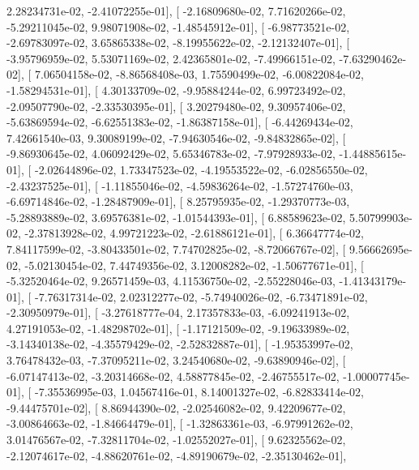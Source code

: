 \documentclass{article}
\begin{document}
          2.28234731e-02,  -2.41072255e-01],
       [ -2.16809680e-02,   7.71620266e-02,  -5.29211045e-02,
          9.98071908e-02,  -1.48545912e-01],
       [ -6.98773521e-02,  -2.69783097e-02,   3.65865338e-02,
         -8.19955622e-02,  -2.12132407e-01],
       [ -3.95796959e-02,   5.53071169e-02,   2.42365801e-02,
         -7.49966151e-02,  -7.63290462e-02],
       [  7.06504158e-02,  -8.86568408e-03,   1.75590499e-02,
         -6.00822084e-02,  -1.58294531e-01],
       [  4.30133709e-02,  -9.95884244e-02,   6.99723492e-02,
         -2.09507790e-02,  -2.33530395e-01],
       [  3.20279480e-02,   9.30957406e-02,  -5.63869594e-02,
         -6.62551383e-02,  -1.86387158e-01],
       [ -6.44269434e-02,   7.42661540e-03,   9.30089199e-02,
         -7.94630546e-02,  -9.84832865e-02],
       [ -9.86930645e-02,   4.06092429e-02,   5.65346783e-02,
         -7.97928933e-02,  -1.44885615e-01],
       [ -2.02644896e-02,   1.73347523e-02,  -4.19553522e-02,
         -6.02856550e-02,  -2.43237525e-01],
       [ -1.11855046e-02,  -4.59836264e-02,  -1.57274760e-03,
         -6.69714846e-02,  -1.28487909e-01],
       [  8.25795935e-02,  -1.29370773e-03,  -5.28893889e-02,
          3.69576381e-02,  -1.01544393e-01],
       [  6.88589623e-02,   5.50799903e-02,  -2.37813928e-02,
          4.99721223e-02,  -2.61886121e-01],
       [  6.36647774e-02,   7.84117599e-02,  -3.80433501e-02,
          7.74702825e-02,  -8.72066767e-02],
       [  9.56662695e-02,  -5.02130454e-02,   7.44749356e-02,
          3.12008282e-02,  -1.50677671e-01],
       [ -5.32520464e-02,   9.26571459e-03,   4.11536750e-02,
         -2.55228046e-03,  -1.41343179e-01],
       [ -7.76317314e-02,   2.02312277e-02,  -5.74940026e-02,
         -6.73471891e-02,  -2.30950979e-01],
       [ -3.27618777e-04,   2.17357833e-03,  -6.09241913e-02,
          4.27191053e-02,  -1.48298702e-01],
       [ -1.17121509e-02,  -9.19633989e-02,  -3.14340138e-02,
         -4.35579429e-02,  -2.52832887e-01],
       [ -1.95353997e-02,   3.76478432e-03,  -7.37095211e-02,
          3.24540680e-02,  -9.63890946e-02],
       [ -6.07147413e-02,  -3.20314668e-02,   4.58877845e-02,
         -2.46755517e-02,  -1.00007745e-01],
       [ -7.35536995e-03,   1.04567416e-01,   8.14001327e-02,
         -6.82833414e-02,  -9.44475701e-02],
       [  8.86944390e-02,  -2.02546082e-02,   9.42209677e-02,
         -3.00864663e-02,  -1.84664479e-01],
       [ -1.32863361e-03,  -6.97991262e-02,   3.01476567e-02,
         -7.32811704e-02,  -1.02552027e-01],
       [  9.62325562e-02,  -2.12074617e-02,  -4.88620761e-02,
         -4.89190679e-02,  -2.35130462e-01],
\end{document}
